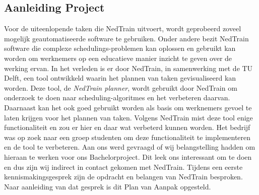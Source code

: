 \subsection{Aanleiding Project}
Voor de uiteenlopende taken die NedTrain uitvoert, wordt geprobeerd zoveel mogelijk geautomatiseerde software te gebruiken. Onder andere bezit NedTrain software die complexe schedulings-problemen kan oplossen en gebruikt kan worden om werknemers op een educatieve manier inzicht te geven over de werking ervan. In het verleden is er door NedTrain, in samenwerking met de TU Delft, een tool ontwikkeld waarin het plannen van taken gevisualiseerd kan worden. Deze tool, de \emph{NedTrain planner}, wordt gebruikt door NedTrain om onderzoek te doen naar scheduling-algoritmes en het verbeteren daarvan. Daarnaast kan het ook goed gebruikt worden als basis om werknemers gevoel te laten krijgen voor het plannen van taken. Volgens NedTrain mist deze tool enige functionaliteit en zou er hier en daar wat verbeterd kunnen worden. Het bedrijf was op zoek naar een groep studenten om deze functionaliteit te implementeren en de tool te verbeteren. Aan ons werd gevraagd of wij belangstelling hadden om hieraan te werken voor ons Bachelorproject. Dit leek ons interessant om te doen en dus zijn wij indirect in contact gekomen met NedTrain. Tijdens een eerste kennismakingsgesprek zijn de opdracht en belangen van NedTrain besproken. Naar aanleiding van dat gesprek is dit Plan van Aanpak opgesteld.
